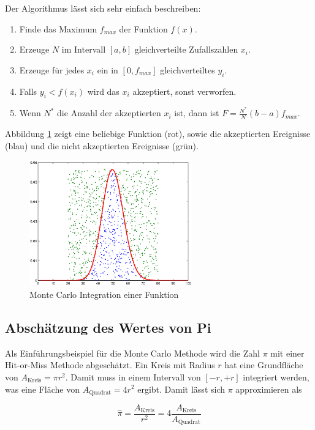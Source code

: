 \documentclass{book}
\begin{document}
\begin{refsection}
Der Algorithmus lässt sich sehr einfach beschreiben:

\begin{enumerate}
	\item Finde das Maximum $f_{max}$ der Funktion $f(x)$.
	\item Erzeuge $N$ im Intervall $[a,b]$ gleichverteilte Zufallszahlen $x_i$.
	\item Erzeuge für jedes $x_i$ ein in $[0,f_{max}]$ gleichverteiltes $y_i$.
	\item Falls $y_i < f(x_i)$ wird das $x_i$ akzeptiert, sonst verworfen.
	\item Wenn $N^*$ die Anzahl der akzeptierten $x_i$ ist, dann ist $F = \frac{N^*}{N}(b-a)f_{max}$.
\end{enumerate}

Abbildung \ref{fig:integration_histogram} zeigt eine beliebige Funktion (rot), sowie die akzeptierten Ereignisse (blau) und die nicht akzeptierten Ereignisse (grün). \\

\begin{figure}[htbp]
	\centering
	\includegraphics[width=7cm]{images/integration_poisson.eps}
	\caption{Monte Carlo Integration einer Funktion}
	\label{fig:integration_histogram}
\end{figure}

\subsection{Abschätzung des Wertes von Pi}
Als Einführungsbeispiel für die Monte Carlo Methode wird die Zahl $\pi$ mit einer Hit-or-Miss Methode abgeschätzt. Ein Kreis mit Radius $r$ hat eine Grundfläche von $A_{\text{Kreis}} = \pi r^{2}$.  Damit muss in einem Intervall von $[-r,+r]$ integriert werden, was eine Fläche von $A_{\text{Quadrat}} = 4r^2$ ergibt. Damit lässt sich $\pi$ approximieren als

\begin{equation}
	\hat{\pi} = \frac{A_{\text{Kreis}}}{r^2} = 4 \frac{A_{\text{Kreis}}}{A_{\text{Quadrat}}}
\end{equation}


\end{refsection}
\end{document}
